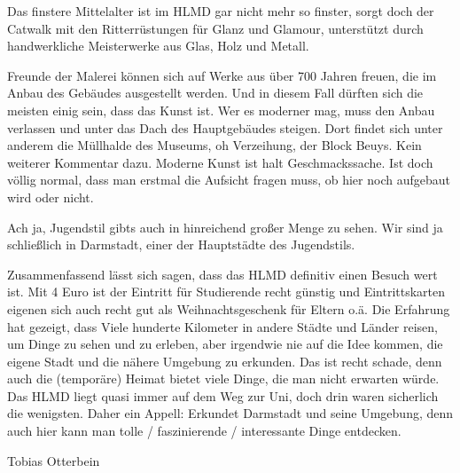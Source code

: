 {    Das finstere Mittelalter ist im HLMD gar nicht mehr so finster, sorgt doch der Catwalk mit den Ritterrüstungen für Glanz und Glamour, unterstützt durch handwerkliche Meisterwerke aus Glas, Holz und Metall.

    Freunde der Malerei können sich auf Werke aus über 700 Jahren freuen, die im Anbau des Gebäudes ausgestellt werden. Und in diesem Fall dürften sich die meisten einig sein, dass das Kunst ist. Wer es moderner mag, muss den Anbau verlassen und unter das Dach des Hauptgebäudes steigen. Dort findet sich unter anderem die Müllhalde des Museums, oh Verzeihung, der Block Beuys. Kein weiterer Kommentar dazu. Moderne Kunst ist halt Geschmackssache. Ist doch völlig normal, dass man erstmal die Aufsicht fragen muss, ob hier noch aufgebaut wird oder nicht.

    Ach ja, Jugendstil gibts auch in hinreichend großer Menge zu sehen. Wir sind ja schließlich in Darmstadt, einer der Hauptstädte des Jugendstils.

    Zusammenfassend lässt sich sagen, dass das HLMD definitiv einen Besuch wert ist. Mit 4 Euro ist der Eintritt für Studierende recht günstig und Eintrittskarten eigenen sich auch recht gut als Weihnachtsgeschenk für Eltern o.ä. Die Erfahrung hat gezeigt, dass Viele hunderte Kilometer in andere Städte und Länder reisen, um Dinge zu sehen und zu erleben, aber irgendwie nie auf die Idee kommen, die eigene Stadt und die nähere Umgebung zu erkunden. Das ist recht schade, denn auch die (temporäre) Heimat bietet viele Dinge, die man nicht erwarten würde. Das HLMD liegt quasi immer auf dem Weg zur Uni, doch drin waren sicherlich die wenigsten. Daher ein Appell: Erkundet Darmstadt und seine Umgebung, denn auch hier kann man tolle / faszinierende / interessante Dinge entdecken.}{Tobias Otterbein}

